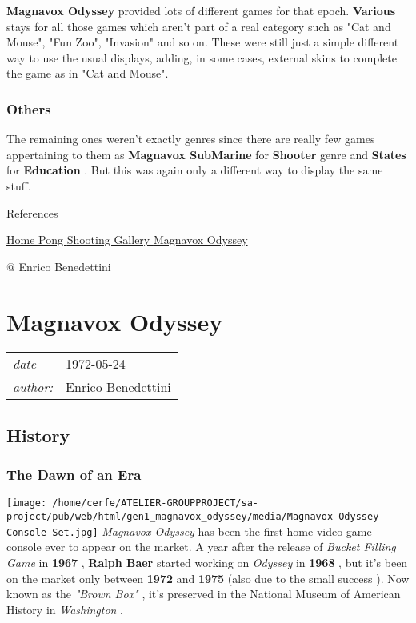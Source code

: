 \documentclass[a4paper,10pt]{book}
\newcommand{\pageHeader}[4]{
    \section{#1}
    \vspace{-0.3cm}
    \begin{table}[h!]
     \begin{tabular}{ll}
        \hline
        \textit{date} & #2 \\
        \textit{author: } & #3\\
        \hline
     \end{tabular}
    \end{table}
    \vspace{-0.3cm}
}
\begin{document}
 \textbf{Magnavox Odyssey }  provided lots of different games for that epoch.
           \textbf{Various }  stays for all those games which aren't part of a real category such as
          "Cat and Mouse", "Fun Zoo", "Invasion" and so on. These were still just a simple different way to
          use the usual displays, adding, in some cases, external skins to complete the game as in "Cat and Mouse".
         
 
 \subsubsection{Others }
 
          The remaining ones weren't exactly genres since there are really few games appertaining to them
          as  \textbf{Magnavox SubMarine }  for  \textbf{Shooter }  genre and  \textbf{States }  for
           \textbf{Education } . But this was again only a different way to display the same stuff.
         
 
 
 
 References 
 
 \href{https://www.pngwing.com/en/free-png-ppgqi}{Home Pong }
 \href{https://www.pngwing.com/en/free-png-ppgqi}{Shooting Gallery }
 \href{https://it.wikipedia.org/wiki/Magnavox_Odyssey}{Magnavox Odyssey }
 
 @ Enrico Benedettini 
 
 
 \newpage\pageHeader{Magnavox Odyssey}{1972-05-24}{Enrico Benedettini}{The first home console ever}
 \subsection{History }
 \subsubsection{The Dawn of an Era }
 \texttt{[image: /home/cerfe/ATELIER-GROUPPROJECT/sa-project/pub/web/html/gen1\_magnavox\_odyssey/media/Magnavox-Odyssey-Console-Set.jpg]}
 \textit{Magnavox Odyssey } has been the first home video game console ever to appear on the market.
          A year after the release of  \textit{Bucket Filling Game } in  \textbf{1967 } ,  \textbf{Ralph Baer } 
          started working on  \textit{Odyssey } in  \textbf{1968 } , but it's been on the market only between  \textbf{1972 } 
          and  \textbf{1975 }  (also due to the  small success ).  
          Now known as the  \textit{"Brown Box" },
          it's preserved in the National Museum of American History in  \textit{Washington }.
         
\end{document}
